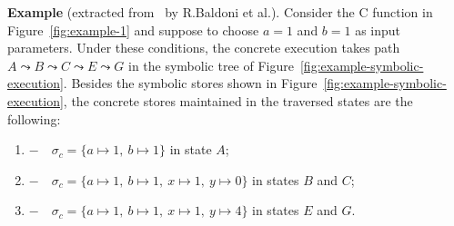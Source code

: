 \vspace{+10pt} 
\textbf{Example} (extracted from~\cite{Baldoni:2018:SSE:3212709.3182657} by R.Baldoni et al.). Consider the C function in Figure~\ref{fig:example-1} and suppose to choose $a = 1$ and $b = 1$ as input parameters. Under these conditions, the concrete execution takes path $A\leadsto B\leadsto C\leadsto E\leadsto G$ in the symbolic tree of Figure~\ref{fig:example-symbolic-execution}. Besides the symbolic stores shown in Figure~\ref{fig:example-symbolic-execution}, the concrete stores maintained in the traversed states are the following:
\begin{enumerate}
	
	\item[]$-$~~$\sigma_c=\{a\mapsto 1,~b\mapsto 1\}$ in state $A$;
	\item[]$-$~~$\sigma_c=\{a\mapsto 1,~b\mapsto 1,~x\mapsto 1,~y\mapsto 0\}$ in states $B$ and $C$;
	\item[]$-$~~$\sigma_c=\{a\mapsto 1,~b\mapsto 1,~x\mapsto 1,~y\mapsto 4\}$ in states $E$ and $G$.
	
\end{enumerate}  
